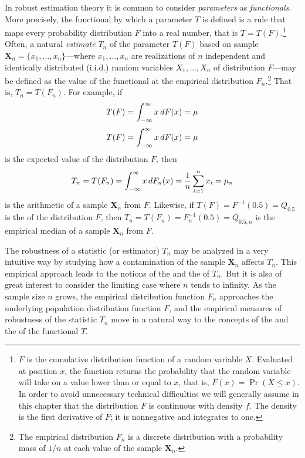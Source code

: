 In robust estimation theory it is common to consider \emph{parameters} as
\emph{functionals}. More precisely, the functional by which a parameter $T$ is
defined is a rule that maps every probability distribution $F$ into a real
number, that is $T = T(F)$.\footnote{$F$ is the cumulative distribution
function of a random variable $X$. Evaluated at position $x$, the function
returns the probability that the random variable will take on a value lower
than or equal to $x$, that is, $F(x) = \Pr(X \leq x)$. In order to avoid
unnecessary technical difficulties we will generally assume in this chapter
that the distribution $F$ is continuous with density $f$. The density is the
first derivative of $F$; it is nonnegative and integrates to one.} Often, a
natural \emph{estimate} $T_n$ of the parameter $T(F)$ based on sample
$\mathbf{X}_n= \{x_1, \dots, x_n\}$---where $x_1, \dots, x_n$ are realizations
of $n$ independent and identically distributed (i.i.d.) random variables $X_1,
\dots, X_n$ of distribution $F$---may be defined as the value of the functional
at the empirical distribution $F_n$.\footnote{The empirical distribution $F_n$
is a discrete distribution with a probability mass of $1/n$ at each value of
the sample $\mathbf{X}_n$.} That is,
$T_n = T(F_n)$. For example, if
\[
    T(F) = \int_{-\infty}^\infty x \mathop{}\!d F(x) = \mu
\]
\[
    T(F) = \int_{-\infty}^\infty x \mathop{}\!d F(x) = \mu
\]
is the expected value of the distribution $F$, then
\[
    T_n = T(F_n) = \int_{-\infty}^\infty x \mathop{}\!d F_n(x) 
          = \frac{1}{n} \sum_{i=1}^n x_i = \mu_n
\]
is the arithmetic  of a sample $\mathbf{X}_n$ from $F$. Likewise, if $T(F) =
F^{-1}(0.5) = Q_{0.5}$ is the  of the distribution $F$, then $T_n =
T(F_n) = F_n^{-1}(0.5) = Q_{0.5;n}$ is the empirical median of a sample
$\mathbf{X}_n$ from $F$.

The robustness of a statistic (or estimator) $T_n$ may be analyzed in a very
intuitive way by studying how a contamination of the sample
$\mathbf{X}_n$ affects $T_n$. This empirical approach leads to the notions of
the \emph{} and the \emph{} of $T_n$. But it is also
of great interest to consider the limiting case where $n$ tends to infinity. As
the sample size $n$ grows, the empirical distribution function $F_n$ approaches
the underlying population distribution function $F$, and the empirical measures
of robustness of the statistic $T_n$ move in a natural way to the concepts of
the \emph{} and the \emph{} of the functional $T$.


